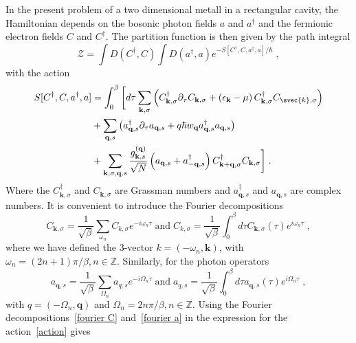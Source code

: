 \documentclass{article}
\begin{document}
In the present problem of a two dimensional metall in a rectangular cavity, the Hamiltonian depends on the bosonic photon fields $a$ and $a^{\dagger}$ and the fermionic electron fields $C$ and $C^{\dagger}$. The partition function is then given by the path integral
\begin{equation}
    \mathcal{Z} = \int D(C^{\dagger}, C) \int D(a^{\dagger}, a) e^{-S[C^{\dagger},C,a^{\dagger},a] / \hbar}\;,
    \label{path integral}
\end{equation}
with the action
\begin{align}
    S[C^{\dagger},C,a^{\dagger},a] &= \int_0^{\beta}\bigg[d\tau \sum_{\textbf{k},\sigma}\left( C_{\textbf{k},\sigma}^{\dagger} \partial_{\tau} C_{\textbf{k},\sigma} + \left(\epsilon_{\textbf{k}} - \mu\right) C_{\textbf{k},\sigma}^{\dagger} C_{\svec{k},\sigma}\right) \nonumber\\ 
                                  &+ \sum_{\textbf{q},s}\left( a_{\textbf{q},s}^{\dagger} \partial_{\tau} a_{\textbf{q},s} +q \hbar w_{\textbf{q}} a_{\textbf{q},s}^{\dagger}a_{\textbf{q},s}\right) \label{action} \\
                                  &+ \sum_{\textbf{k},\sigma,\textbf{q},s} \frac{g_{\textbf{k},s}^{(\textbf{q})}}{\sqrt{N}} \left(a_{\textbf{q},s} + a_{-\textbf{q}, s}^{\dagger}\right) C_{\textbf{k} + \textbf{q},\sigma}^{\dagger} C_{\textbf{k},\sigma}\bigg]\nonumber \;.
\end{align}
Where the $C_{\textbf{k},\sigma}^{\dagger}$ and $C_{\textbf{k},\sigma}$ are Grassman numbers and $a_{\textbf{q},s}^{\dagger}$ and $a_{\textbf{q},s}$ are complex numbers. It is convenient to introduce the Fourier decompositions
\begin{equation}
C_{\textbf{k},\sigma} = \frac{1}{\sqrt{\beta}}\sum_{\omega_n} C_{k,\sigma} e^{-i \omega_n \tau}\;\text{and}\; C_{k,\sigma} = \frac{1}{\sqrt{\beta}} \int_0^{\beta} d\tau C_{\textbf{k},\sigma}(\tau) e^{i \omega_n \tau}\;,
\label{fourier C}
\end{equation}
where we have defined the $3$-vector $k = (-\omega_n,\textbf{k})$, with $\omega_n = (2n + 1)\pi / \beta, n \in  \mathbb{Z}$. Similarly, for the photon operators
\begin{equation}
a_{\textbf{q},s} = \frac{1}{\sqrt{\beta}}\sum_{\Omega_n} a_{q,s} e^{-i \Omega_n \tau}\;\text{and}\; a_{q,s} = \frac{1}{\sqrt{\beta}} \int_0^{\beta} d\tau a_{\textbf{q},s}(\tau) e^{i \Omega_n \tau}\;,
\label{fourier a}
\end{equation}
with $q = (-\Omega_n,\textbf{q})$ and $\Omega_n = 2n\pi / \beta, n \in  \mathbb{Z}$. Using the Fourier decompositions~\cref{fourier C} and~\cref{fourier a} in the expression for the action~\cref{action} gives
\end{document}
